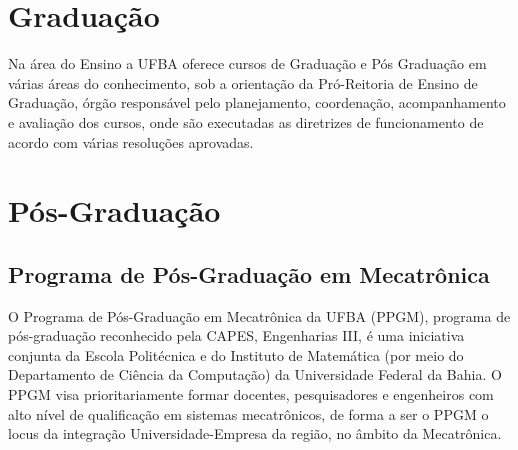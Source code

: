 \chapter{Graduação}

Na área do Ensino a UFBA oferece cursos de Graduação e Pós Graduação em várias áreas do conhecimento, sob a orientação da Pró-Reitoria de Ensino de Graduação, órgão responsável pelo planejamento, coordenação, acompanhamento e avaliação dos cursos, onde são executadas as diretrizes de funcionamento de acordo com várias resoluções  aprovadas.


\newpage

\newpage


\chapter{Pós-Graduação}



     \section{Programa de Pós-Graduação em Mecatrônica}  
O Programa de Pós-Graduação em Mecatrônica da UFBA (PPGM), programa de pós-graduação reconhecido pela CAPES, Engenharias III, é uma iniciativa conjunta da Escola Politécnica e do Instituto de Matemática (por meio do Departamento de Ciência da Computação) da Universidade Federal da Bahia. O PPGM visa prioritariamente formar docentes, pesquisadores e engenheiros com alto nível de qualificação em sistemas mecatrônicos, de forma a ser o PPGM o locus da integração Universidade-Empresa da região, no âmbito da Mecatrônica.
